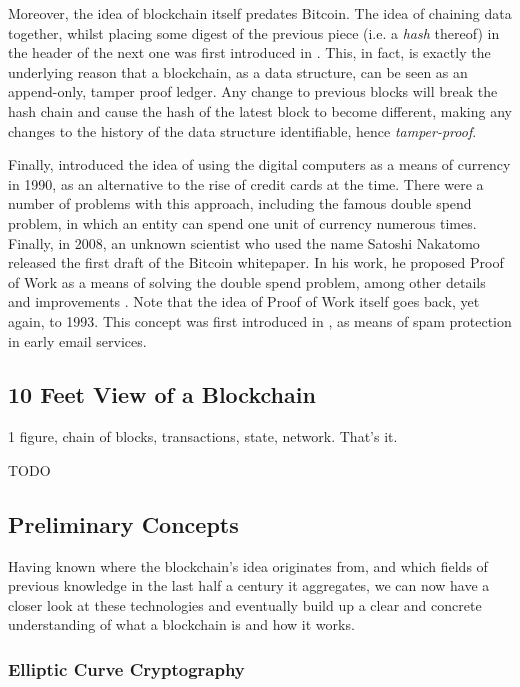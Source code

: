 Moreover, the idea of blockchain itself predates Bitcoin. The idea of chaining data together, whilst
placing some digest of the previous piece (i.e. a \textit{hash} thereof) in the header of the next
one was first introduced in \cite{haberHowTimestampDigital1991}. This, in fact, is exactly the
underlying reason that a blockchain, as a data structure, can be seen as an append-only, tamper
proof ledger. Any change to previous blocks will break the hash chain and cause the hash of the
latest block to become different, making any changes to the history of the data structure
identifiable, hence \textit{tamper-proof}.

Finally, \cite{chaumUntraceableElectronicCash1990} introduced the idea of using the digital
computers as a means of currency in 1990, as an alternative to the rise of credit cards at the time.
There were a number of problems with this approach, including the famous double spend problem, in
which an entity can spend one unit of currency numerous times. Finally, in 2008, an unknown
scientist who used the name Satoshi Nakatomo released the first draft of the Bitcoin whitepaper. In
his work, he proposed Proof of Work as a means of solving the double spend problem, among other
details and improvements \cite{nakamotoBitcoinPeertoPeerElectronic}. Note that the idea of Proof of
Work itself goes back, yet again, to 1993. This concept was first introduced in
\cite{dworkPricingProcessingCombatting1993}, as means of spam protection in early email services.

\subsection{10 Feet View of a Blockchain}

1 figure, chain of blocks, transactions, state, network. That's it.

TODO

\subsection{Preliminary Concepts} \label{chap_bg:sec:preliminary}

Having known where the blockchain's idea originates from, and which fields of previous knowledge in
the last half a century it aggregates, we can now have a closer look at these technologies and
eventually build up a clear and concrete understanding of what a blockchain is and how it works.

\subsubsection{Elliptic Curve Cryptography} \label{chap_bg:subsec:ecc}


